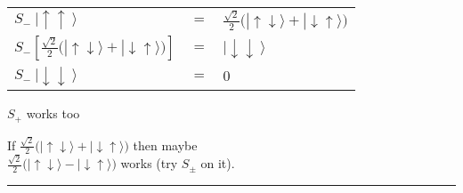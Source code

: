 \documentclass[12pt]{article}
\begin{document}
\vspace{15pt} \noindent
\begin{minipage}{.4\textwidth}
    {\setlength{\tabcolsep}{3pt}
    \begin{tabular}{l c l}
        \(S_-  \ | \uparrow \uparrow \ \rangle \)
            & \(=\)
            & \( \tfrac{\sqrt{2}}{2} \big( | {\scriptstyle \uparrow \downarrow} \rangle +
                | {\scriptstyle \downarrow \uparrow} \rangle \big) \) \\[5pt]
        \( S_- \left[ \tfrac{\sqrt{2}}{2} \big( | {\scriptstyle \uparrow \downarrow} \rangle +
            | {\scriptstyle \downarrow \uparrow} \rangle \big) \right] \)
            & \(=\)
            & \( | \downarrow \downarrow \ \rangle \) \\[5pt]
        \( S_- \ | \downarrow \downarrow \ \rangle \)
        & \(=\) 
        & \(0\)
    \end{tabular} }

    \vspace{20pt}
    \(S_+\) works too

    \vspace{20pt}
    If \( \tfrac{\sqrt{2}}{2} \big( | {\scriptstyle \uparrow \downarrow} \rangle +
        | {\scriptstyle \downarrow \uparrow} \rangle \big) \) then maybe \\
    \( \tfrac{\sqrt{2}}{2} \big( | {\scriptstyle \uparrow \downarrow} \rangle -
        | {\scriptstyle \downarrow \uparrow} \rangle \big) \) works (try \(S_\pm\) on it).

\end{minipage}
\hspace{5pt}
\rule[-75pt]{.5pt}{155pt}
\hspace{5pt}
\end{document}
